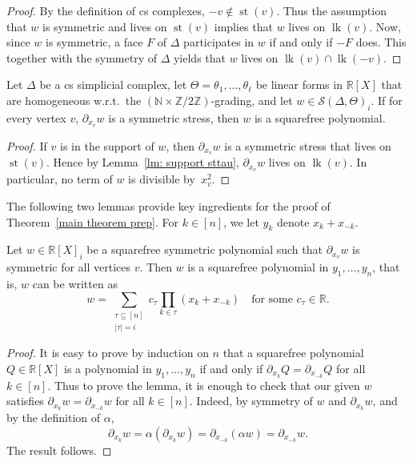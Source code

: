 \documentclass[ALCO,ThmDefs,Unicode,epreuves]{cedram}
\DeclareMathOperator{\lk}{lk}
\DeclareMathOperator{\st}{st}
\newcommand{\N}{\mathbb{N}}
\newcommand{\R}{\mathbb{R}{}}
\newcommand{\Z}{{\mathbb Z}}
\begin{document}
\begin{proof} By the definition of cs complexes, $-v\notin \st(v)$. Thus the assumption that $w$ is symmetric and lives on $\st(v)$ implies that $w$ lives on $\lk(v)$. Now, since $w$ is symmetric, a face $F$ of $\Delta$ participates in $w$ if and only if $-F$ does. This together with the symmetry of $\Delta$ yields that $w$ lives on $\lk(v)\cap\lk(-v)$.
\end{proof}

\begin{lemma} \label{lm: squarefree}
Let $\Delta$ be a cs simplicial complex, let $\Theta=\theta_1,\ldots,\theta_\ell$ be linear forms in $\R[X]$ that are homogeneous w.r.t.~the $(\N \times \Z/2\Z)$-grading, and let $w\in \mathcal{S}(\Delta, \Theta)_i$. If for every vertex $v$, $\partial_{x_v} w$ is a symmetric stress, then $w$ is a squarefree polynomial.
\end{lemma}

\begin{proof}
 If $v$ is in the support of $w$, then $\partial_{x_v}w$ is a symmetric stress that lives on $\st(v)$. Hence by Lemma~\ref{lm: support sttau}, $\partial_{x_v}w$ lives on $\lk(v)$. In particular, no term of $w$ is divisible by~$x_v^2$.
\end{proof}

The following two lemmas provide key ingredients for the proof of Theorem~\ref{main theorem prep}. For $k\in [n]$, we let $y_k$ denote $x_k+x_{-k}$.

\begin{lemma}\label{lm: symmetric stress expression}
Let $w \in \R[X]_i$ be a squarefree symmetric polynomial such that $\partial_{x_v} w$ is symmetric for all vertices $v$. Then $w$ is a squarefree polynomial in $y_1,\ldots,y_n$, that is, $w$ can be written as $$w=\sum_{\substack{\tau\subseteq [n]\\|\tau|=i}} c_\tau \prod_{k\in \tau} (x_k+x_{-k}) \quad \mbox{for some $c_\tau\in \R$}.$$ 
\end{lemma}
\begin{proof}
 It is easy to prove by induction on $n$ that a squarefree polynomial $Q\in\R[X]$ is a polynomial in $y_1,\ldots,y_n$ if and only if $\partial_{x_{k}}Q=\partial_{x_{-k}}Q$ for all $k\in [n]$. Thus 
to prove the lemma, it is enough to check that our given $w$ satisfies $\partial_{x_{k}}w=\partial_{x_{-k}}w$ for all $k\in [n]$. Indeed, by symmetry of $w$ and $\partial_{x_k} w$, and by the definition of $\alpha$,
\[ 
\partial_{x_{k}}w=\alpha(\partial_{x_{k}}w)=\partial_{x_{-k}} (\alpha w)=\partial_{x_{-k}} w.
\]
The result follows.
\end{proof}
\end{document}
